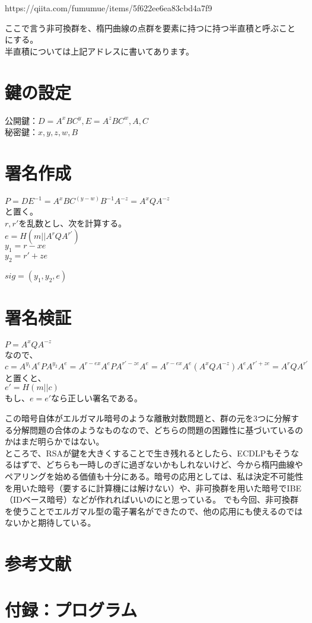 \documentclass[
]{article}
\begin{document}
https://qiita.com/fumumue/items/5f622ee6ea83cbd4a7f9

ここで言う非可換群を、楕円曲線の点群を要素に持つに持つ半直積と呼ぶことにする。\\
半直積については上記アドレスに書いてあります。

\hypertarget{ux9375ux306eux8a2dux5b9a}{%
\section{鍵の設定}\label{ux9375ux306eux8a2dux5b9a}}

公開鍵：\(D=A^xBC^y,E=A^zBC^w,A,C\)\\
秘密鍵：\(x,y,z,w,B\)

\hypertarget{ux7f72ux540dux4f5cux6210}{%
\section{署名作成}\label{ux7f72ux540dux4f5cux6210}}

\(P=DE^{-1}=A^xBC^{(y-w)}B^{-1}A^{-z}=A^xQA^{-z}\)\\
と置く。\\
\(r,r'\)を乱数とし、次を計算する。\\
\(e=H(m||A^rQA^{r'})\)\\
\(y_1=r-xe\)\\
\(y_2=r'+ze\)

\(sig=(y_1,y_2,e)\)

\hypertarget{ux7f72ux540dux691cux8a3c}{%
\section{署名検証}\label{ux7f72ux540dux691cux8a3c}}

\(P=A^xQA^{-z}\)\\
なので、\\
\(c=A^{y_1}A^{e}PA^{y_2}A^{e}=A^{r-ex}A^{e}PA^{r'-ze}A^{e}=A^{r-ex}A^{e}(A^xQA^{-z})A^{e}A^{r'+ze}=A^rQA^{r'}\)\\
と置くと、\\
\(e'=H(m||c)\)\\
もし、\(e=e'\)なら正しい署名である。

この暗号自体がエルガマル暗号のような離散対数問題と、群の元を3つに分解する分解問題の合体のようなものなので、どちらの問題の困難性に基づいているのかはまだ明らかではない。\\
ところで、RSAが鍵を大きくすることで生き残れるとしたら、ECDLPもそうなるはずで、どちらも一時しのぎに過ぎないかもしれないけど、今から楕円曲線やペアリングを始める価値も十分にある。暗号の応用としては、私は決定不可能性を用いた暗号（要するに計算機には解けない）や、非可換群を用いた暗号でIBE（IDベース暗号）などが作れればいいのにと思っている。
でも今回、非可換群を使うことでエルガマル型の電子署名ができたので、他の応用にも使えるのではないかと期待している。

\hypertarget{ux53c2ux8003ux6587ux732e}{%
\section{参考文献}\label{ux53c2ux8003ux6587ux732e}}

\hypertarget{ux4ed8ux9332ux30d7ux30edux30b0ux30e9ux30e0}{%
\section{付録：プログラム}\label{ux4ed8ux9332ux30d7ux30edux30b0ux30e9ux30e0}}
\end{document}
